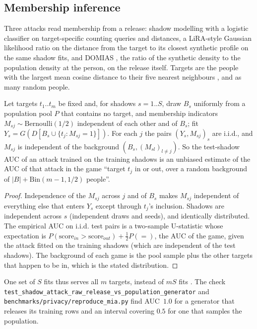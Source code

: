 \subsection{Membership inference}
Three attacks read membership from a release: shadow modelling \cite{stadler2022,houssiau2022} with a logistic classifier on target-specific counting queries and distances, a LiRA-style Gaussian likelihood ratio on the distance from the target to its closest synthetic profile \cite{carlini2022} on the same shadow fits, and DOMIAS \cite{vanbreugel2023}, the ratio of the synthetic density to the population density at the person, on the release itself. Targets are the people with the largest mean cosine distance to their five nearest neighbours \cite{meeus2023}, and as many random people.
\setcounter{proposition}{601}
\begin{proposition}\label{prop:pushadow}
Let targets $t_1..t_m$ be fixed and, for shadows $s=1..S$, draw $B_s$ uniformly from a population pool $P$ that contains no target, and membership indicators $M_{sj}\sim\mathrm{Bernoulli}(1/2)$ independent of each other and of $B_s$; fit $Y_s=G(D[B_s\cup\{t_j:M_{sj}=1\}])$. For each $j$ the pairs $(Y_s,M_{sj})_{s}$ are i.i.d., and $M_{sj}$ is independent of the background $(B_s,(M_{sl})_{l\ne j})$. So the test-shadow AUC of an attack trained on the training shadows is an unbiased estimate of the AUC of that attack in the game ``target $t_j$ in or out, over a random background of $|B|+\mathrm{Bin}(m-1,1/2)$ people''.
\end{proposition}
\begin{proof}
Independence of the $M_{sj}$ across $j$ and of $B_s$ makes $M_{sj}$ independent of everything else that enters $Y_s$ except through $t_j$'s inclusion. Shadows are independent across $s$ (independent draws and seeds), and identically distributed. The empirical AUC on i.i.d. test pairs is a two-sample U-statistic whose expectation is $P(\text{score}_{in}>\text{score}_{out})+\tfrac12 P(=)$, the AUC of the game, given the attack fitted on the training shadows (which are independent of the test shadows). The background of each game is the pool sample plus the other targets that happen to be in, which is the stated distribution.
\end{proof}
\noindent One set of $S$ fits thus serves all $m$ targets, instead of $mS$ fits \cite{houssiau2022,meeus2023}. The check \texttt{test\_shadow\_attack\_raw\_release\_vs\_population\_generator} and \texttt{benchmarks/privacy/reproduce\_mia.py} find AUC~$1.0$ for a generator that releases its training rows and an interval covering $0.5$ for one that samples the population.


